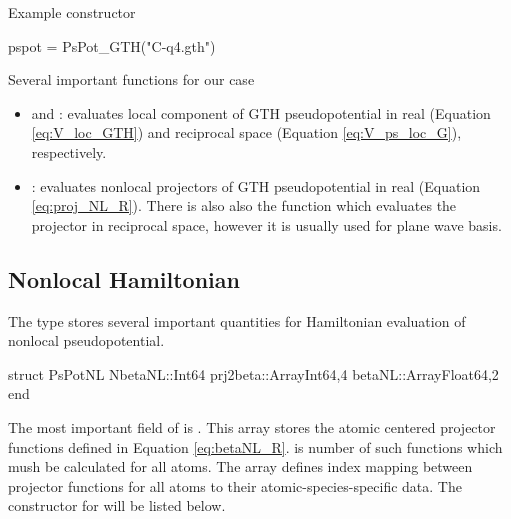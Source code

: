 Example constructor
\begin{juliacode}
pspot = PsPot_GTH("C-q4.gth")
\end{juliacode}

Several important functions for our case
\begin{itemize}
\item {} and : evaluates local component
  of GTH pseudopotential in real (Equation \eqref{eq:V_loc_GTH})
  and reciprocal space (Equation \eqref{eq:V_ps_loc_G}), respectively.
\item {}: evaluates nonlocal projectors
  of GTH pseudopotential in real (Equation \eqref{eq:proj_NL_R}).
  There is also also the function  which evaluates the
  projector in reciprocal space, however it is usually used for plane wave basis.
\end{itemize}


\subsection{Nonlocal Hamiltonian}

The type  stores several important quantities for Hamiltonian
evaluation of nonlocal pseudopotential.
%
\begin{juliacode}
struct PsPotNL
    NbetaNL::Int64
    prj2beta::Array{Int64,4}
    betaNL::Array{Float64,2}
end
\end{juliacode}
%
The most important field of  is . This array stores
the atomic centered projector functions defined in Equation \eqref{eq:betaNL_R}.
 is number of such functions which mush be calculated for
all atoms. The array  defines index mapping between projector
functions for all atoms to their atomic-species-specific data. The constructor
for  will be listed below.

